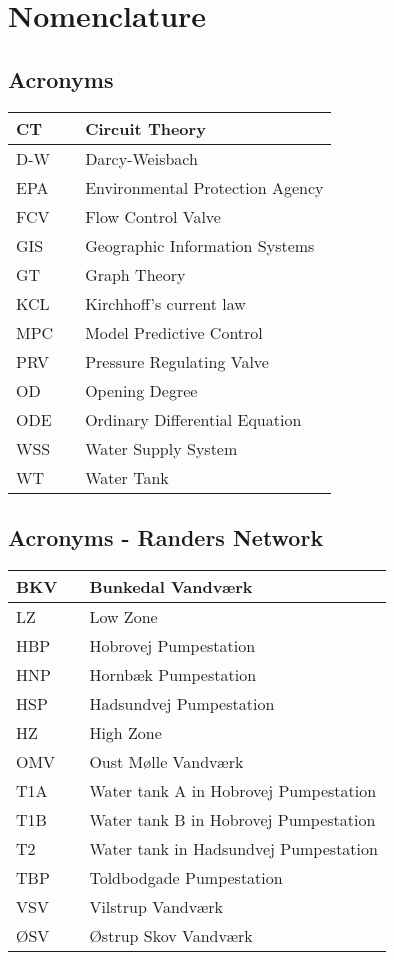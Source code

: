 \chapter{Nomenclature}

\section*{Acronyms}
	
	\begin{tabular}{|l c l|} \hline
		CT      &&	Circuit Theory									\\ \hline
		D-W     &&	Darcy-Weisbach									\\ \hline
		EPA     &&	Environmental Protection Agency					\\ \hline
		FCV     &&	Flow Control Valve								\\ \hline
		GIS     &&	Geographic Information Systems					\\ \hline
		GT      &&	Graph Theory									\\ \hline
		KCL     &&	Kirchhoff's current law							\\ \hline
		MPC 	&&	Model Predictive Control						\\ \hline		
		PRV     &&	Pressure Regulating Valve						\\ \hline
		OD		&&	Opening Degree									\\ \hline
		ODE		&&	Ordinary Differential Equation					\\ \hline
		WSS 	&&	Water Supply System								\\ \hline
		WT  	&&	Water Tank										\\ \hline
	\end{tabular}

\section*{Acronyms - Randers Network}
	
	\begin{tabular}{|l c l|} \hline
		BKV     &&	Bunkedal Vandværk 										\\ \hline
		LZ      &&	Low Zone												\\ \hline
		HBP     &&	Hobrovej Pumpestation 									\\ \hline
		HNP     &&	Hornbæk Pumpestation 									\\ \hline
		HSP 	&&	Hadsundvej Pumpestation 								\\ \hline		
		HZ      &&	High Zone												\\ \hline
		OMV		&&	Oust Mølle Vandværk 									\\ \hline
		T1A 	&&	Water tank A in Hobrovej Pumpestation					\\ \hline
		T1B 	&&	Water tank B in Hobrovej Pumpestation					\\ \hline
		T2 		&&	Water tank in Hadsundvej Pumpestation					\\ \hline
		TBP 	&&	Toldbodgade Pumpestation 								\\ \hline
		VSV 	&&	Vilstrup Vandværk 										\\ \hline
		ØSV 	&&	Østrup Skov Vandværk 									\\ \hline
	\end{tabular}

